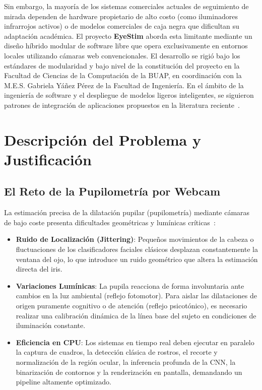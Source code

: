 \documentclass[twocolumn,10pt,letterpaper]{article}
\begin{document}
Sin embargo, la mayoría de los sistemas comerciales actuales de seguimiento de mirada dependen de hardware propietario de alto costo (como iluminadores infrarrojos activos) o de modelos comerciales de caja negra que dificultan su adaptación académica. El proyecto \textbf{EyeStim} aborda esta limitante mediante un diseño híbrido modular de software libre que opera exclusivamente en entornos locales utilizando cámaras web convencionales. El desarrollo se rigió bajo los estándares de modularidad y bajo nivel de la constitución del proyecto en la Facultad de Ciencias de la Computación de la BUAP, en coordinación con la M.E.S. Gabriela Yáñez Pérez de la Facultad de Ingeniería. En el ámbito de la ingeniería de software y el despliegue de modelos ligeros inteligentes, se siguieron patrones de integración de aplicaciones propuestos en la literatura reciente~\cite{huyen2025}.

\section{Descripción del Problema y Justificación}

\subsection{El Reto de la Pupilometría por Webcam}
La estimación precisa de la dilatación pupilar (pupilometría) mediante cámaras de bajo coste presenta dificultades geométricas y lumínicas críticas~\cite{kassner2014}:
\begin{itemize}
    \item \textbf{Ruido de Localización (Jittering)}: Pequeños movimientos de la cabeza o fluctuaciones de los clasificadores faciales clásicos desplazan constantemente la ventana del ojo, lo que introduce un ruido geométrico que altera la estimación directa del iris.
    \item \textbf{Variaciones Lumínicas}: La pupila reacciona de forma involuntaria ante cambios en la luz ambiental (reflejo fotomotor). Para aislar las dilataciones de origen puramente cognitivo o de atención (reflejo psicotónico), es necesario realizar una calibración dinámica de la línea base del sujeto en condiciones de iluminación constante.
    \item \textbf{Eficiencia en CPU}: Los sistemas en tiempo real deben ejecutar en paralelo la captura de cuadros, la detección clásica de rostros, el recorte y normalización de la región ocular, la inferencia profunda de la CNN, la binarización de contornos y la renderización en pantalla, demandando un pipeline altamente optimizado.
\end{itemize}
\end{document}
